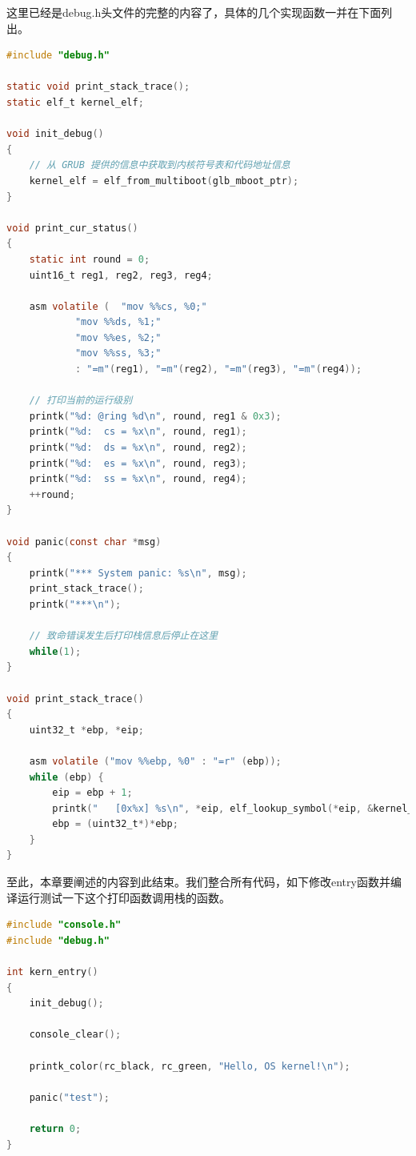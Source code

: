 \par 这里已经是debug.h头文件的完整的内容了，具体的几个实现函数一并在下面列出。

\begin{lstlisting}[language = C, label = kernel/debug/debug.c, caption = kernel/debug/debug.c]
#include "debug.h"

static void print_stack_trace();
static elf_t kernel_elf;

void init_debug()
{
	// 从 GRUB 提供的信息中获取到内核符号表和代码地址信息
	kernel_elf = elf_from_multiboot(glb_mboot_ptr);
}

void print_cur_status()
{
	static int round = 0;
	uint16_t reg1, reg2, reg3, reg4;

	asm volatile ( 	"mov %%cs, %0;"
			"mov %%ds, %1;"
			"mov %%es, %2;"
			"mov %%ss, %3;"
			: "=m"(reg1), "=m"(reg2), "=m"(reg3), "=m"(reg4));

	// 打印当前的运行级别
	printk("%d: @ring %d\n", round, reg1 & 0x3);
	printk("%d:  cs = %x\n", round, reg1);
	printk("%d:  ds = %x\n", round, reg2);
	printk("%d:  es = %x\n", round, reg3);
	printk("%d:  ss = %x\n", round, reg4);
	++round;
}

void panic(const char *msg)
{
	printk("*** System panic: %s\n", msg);
	print_stack_trace();
	printk("***\n");
	
	// 致命错误发生后打印栈信息后停止在这里
	while(1);
}

void print_stack_trace()
{
	uint32_t *ebp, *eip;

	asm volatile ("mov %%ebp, %0" : "=r" (ebp));
	while (ebp) {
		eip = ebp + 1;
		printk("   [0x%x] %s\n", *eip, elf_lookup_symbol(*eip, &kernel_elf));
		ebp = (uint32_t*)*ebp;
	}
}
\end{lstlisting}

\par 至此，本章要阐述的内容到此结束。我们整合所有代码，如下修改entry函数并编译运行测试一下这个打印函数调用栈的函数。

\begin{lstlisting}[language = C, label = init/entry.c, caption = init/entry.c]
#include "console.h"
#include "debug.h"

int kern_entry()
{
	init_debug();

	console_clear();

	printk_color(rc_black, rc_green, "Hello, OS kernel!\n");

	panic("test");

	return 0;
}
\end{lstlisting}

